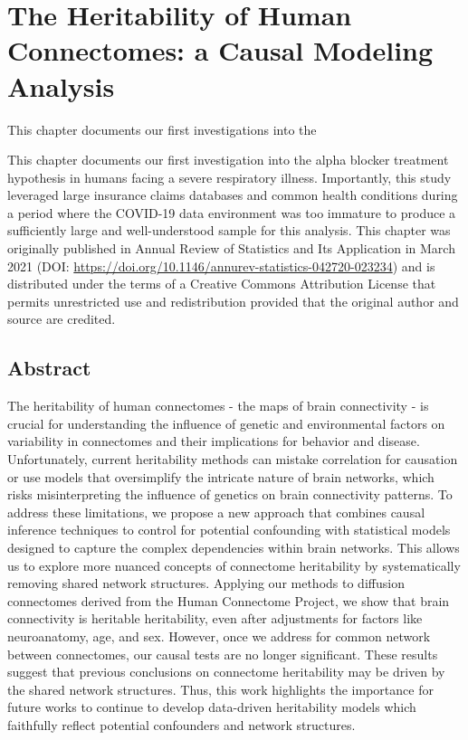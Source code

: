 \chapter[The Heritability of Human Connectomes]{The Heritability of Human Connectomes: a Causal Modeling Analysis} \label{chap:heritability}

This chapter documents our first investigations into the 

This chapter documents our first investigation into the alpha blocker treatment hypothesis in humans facing a severe respiratory illness. Importantly, this study leveraged large insurance claims databases and common health conditions during a period where the COVID-19 data environment was too immature to produce a sufficiently large and well-understood sample for this analysis. This chapter was originally published in Annual Review of Statistics and Its Application in March 2021 (DOI: \url{https://doi.org/10.1146/annurev-statistics-042720-023234}) and is distributed under the terms of a Creative Commons Attribution License that permits unrestricted use and redistribution provided that the original author and source are credited.

\begin{singlespace}         %
     
\end{singlespace} 

\pagebreak
\section*{Abstract}
The heritability of human connectomes - the maps of brain connectivity - is crucial for understanding the influence of genetic and environmental factors on variability in connectomes and their implications for behavior and disease. Unfortunately, current heritability methods can mistake correlation for causation or use models that oversimplify the intricate nature of brain networks, which risks misinterpreting the influence of genetics on brain connectivity patterns. To address these limitations, we propose a new approach that combines causal inference techniques to control for potential confounding with statistical models designed to capture the complex dependencies within brain networks. This allows us to explore more nuanced concepts of connectome heritability by systematically removing shared network structures. Applying our methods to diffusion connectomes derived from the Human Connectome Project, we show that brain connectivity is heritable heritability, even after adjustments for factors like neuroanatomy, age, and sex. However, once we address for common network between connectomes, our causal tests are no longer significant. These results suggest that previous conclusions on connectome heritability may be driven by the shared network structures. Thus, this work highlights the importance for future works to continue to develop data-driven heritability models which faithfully reflect potential confounders and network structures.
\pagebreak







